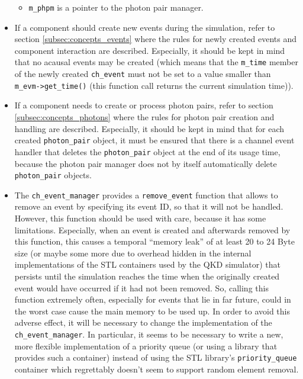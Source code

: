 \begin{itemize}
\begin{itemize}
\item \texttt{m\_phpm} is a pointer to the photon pair manager.

\end{itemize}

\item If a component should create new events during the simulation, refer to section \ref{subsec:concepts_events} where the rules for newly created events and component interaction are described. Especially, it should be kept in mind that no acausal events may be created (which means that the \texttt{m\_time} member of the newly created \texttt{ch\_event} must not be set to a value smaller than \texttt{m\_evm->get\_time()} (this function call returns the current simulation time)).

\item If a component needs to create or process photon pairs, refer to section \ref{subsec:concepts_photons} where the rules for photon pair creation and handling are described. Especially, it should be kept in mind that for each created \texttt{photon\_pair} object, it must be ensured that there is a channel event handler that deletes the \texttt{photon\_pair} object at the end of its usage time, because the photon pair manager does not by itself automatically delete \texttt{photon\_pair} objects.

\item The \texttt{ch\_event\_manager} provides a \texttt{remove\_event} function that allows to remove an event by specifying its event ID, so that it will not be handled. However, this function should be used with care, because it has some limitations. Especially, when an event is created and afterwards removed by this function, this causes a temporal ``memory leak'' of at least 20 to 24 Byte size (or maybe some more due to overhead hidden in the internal implementations of the STL containers used by the QKD simulator) that persists until the simulation reaches the time when the originally created event would have occurred if it had not been removed. So, calling this function extremely often, especially for events that lie in far future, could in the worst case cause the main memory to be used up. In order to avoid this adverse effect, it will be necessary to change the implementation of the \texttt{ch\_event\_manager}. In particular, it seems to be necessary to write a new, more flexible implementation of a priority queue (or using a library that provides such a container) instead of using the STL library's \texttt{priority\_queue} container which regrettably doesn't seem to support random element removal.

\end{itemize}

